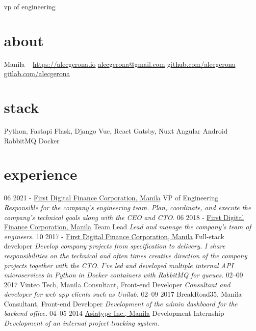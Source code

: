 \documentclass[]{friggeri-cv}
\begin{document}
       {vp of engineering}


\begin{aside}
  \section{about}
    Manila
    ~
    \href{https://alecgerona.io}{https://alecgerona.io}
    \href{mailto:alecgerona.com}{alecgerona@gmail.com}
    \href{github.com/alecgerona}{github.com/alecgerona}
    \href{https://gitlab.com/alecgerona}{gitlab.com/alecgerona}
  \section{stack}
    Python, Fastapi
    Flask, Django
    Vue, React
    Gatsby, Nuxt
    Angular
    Android
    RabbitMQ
    Docker
\end{aside}

\section{experience}
\begin{entrylist}
  \entry
    {06 2021 -}
    {\href{https://firstdigitalfinance.com}{First Digital Finance Corporation, Manila}}
    {VP of Engineering}
    {\emph{Responsible for the company’s engineering team. Plan, coordinate, and execute the company’s technical goals along with the CEO and CTO.
}}
  \entry
    {06 2018 -}
    {\href{https://firstdigitalfinance.com}{First Digital Finance Corporation, Manila}}
    {Team Lead}
    {\emph{Lead and manage the company's team of engineers.
}}
  \entry
    {10 2017 -}
    {\href{https://firstdigitalfinance.com}{First Digital Finance Corporation, Manila}}
    {Full-stack developer}
    {\emph{Develop company projects from specification to delivery. I share responsibilities on the technical and often times creative direction of the company projects together with the CTO. I've led and developed multiple internal API microservices in Python in Docker containers with RabbitMQ for queues.
}}
  \entry
    {02–09 2017}
    {Vinteo Tech, Manila}
    {Consultant, Front-end Developer}
    {\emph{Consultant and developer for web app clients such as Unilab.}}
  \entry
    {02–09 2017}
    {BreakRoad35, Manila}
    {Consultant, Front-end Developer}
    {\emph{Development of the admin dashboard for the backend office.}}
  \entry
    {04–05 2014}
    {\href{http://www.asiatype.com/}{Asiatype Inc., Manila}}
    {Development Internship}
    {\emph{Development of an internal project tracking system.}}
\end{entrylist}
\end{document}
